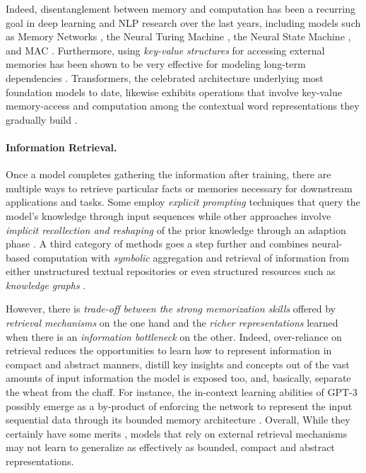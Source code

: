 Indeed, disentanglement between memory and computation has been a recurring goal in deep learning and NLP research over the last years, including models such as Memory Networks \citep{Weston2015MemoryN,Sukhbaatar2015WeaklySM}, the Neural Turing Machine \citep{ntm,dnc}, the Neural State Machine \citep{nsm}, and MAC \citep{mac}. Furthermore, using \textit{key-value structures} \citep{kv} for accessing external memories has been shown to be very effective for modeling long-term dependencies \citep{ent,Bosselut2018SimulatingAD,Lample2019LargeML}. 
Transformers, the celebrated architecture underlying most foundation models to date, likewise exhibits operations that involve key-value memory-access and computation among the contextual word representations they gradually build \citep{Geva2020TransformerFL}. 

\paragraph{Information Retrieval.} Once a model completes gathering the information after training, there are multiple ways to retrieve particular facts or memories necessary for downstream applications and tasks. Some employ \textit{explicit prompting} techniques that query the model's knowledge through input sequences \citep{Petroni2019LanguageMA,Kassner2021MultilingualLI,jiang-etal-2020-know}  while other approaches involve \textit{implicit recollection and reshaping} of the prior knowledge through an adaption phase \citep{Bosselut2019COMETCT,Hwang2021COMETATOMIC2O}. A third category of methods goes a step further and combines neural-based computation with \textit{symbolic} aggregation and retrieval of information from either unstructured textual repositories \citep{karpukhin2020dense,lewis2020retrieval,Khattab-etal:2020:OpenQA} or even structured resources such as \textit{knowledge graphs} \citep{Zhang2019ERNIEEL,Peters2019KnowledgeEC,Liu2020KBERTEL,Verga2020FactsAE,yasunaga2021qagnn}.

However, there is \textit{trade-off between the strong memorization skills} offered by \textit{retrieval mechanisms} on the one hand and the \textit{richer representations} learned when there is an \textit{information bottleneck} on the other. Indeed, over-reliance on retrieval reduces the opportunities to learn how to represent information in compact and abstract manners, distill key insights and concepts out of the vast amounts of input information the model is exposed too, and, basically, separate the wheat from the chaff. For instance, the in-context learning abilities of GPT-3 possibly emerge  as a by-product of enforcing the network to represent the input sequential data through its bounded memory architecture \citep{brown2020gpt3}. Overall, While they certainly have some merits \citep{guu2020realm}, models that rely on external retrieval mechanisms may not learn to generalize as effectively as bounded, compact and abstract representations.

